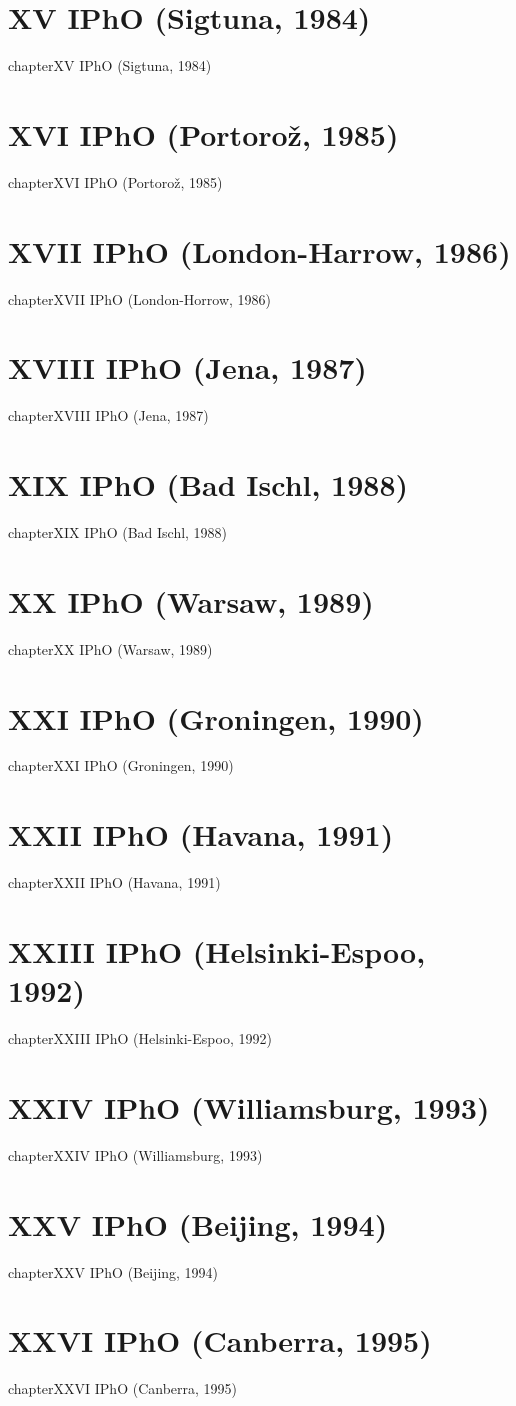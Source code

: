 \documentclass[12pt,a4paper]{book}
\begin{document}
\chapter*{XV IPhO (Sigtuna, 1984)}
{chapter}{XV IPhO (Sigtuna, 1984)}
\chapter*{XVI IPhO (Portoro\v{z}, 1985)}
{chapter}{XVI IPhO (Portoro\v{z}, 1985)}
\chapter*{XVII IPhO (London-Harrow, 1986)}
{chapter}{XVII IPhO (London-Horrow, 1986)}
\chapter*{XVIII IPhO (Jena, 1987)}
{chapter}{XVIII IPhO (Jena, 1987)}
\chapter*{XIX IPhO (Bad Ischl, 1988)}
{chapter}{XIX IPhO (Bad Ischl, 1988)}
\chapter*{XX IPhO (Warsaw, 1989)}
{chapter}{XX IPhO (Warsaw, 1989)}
\chapter*{XXI IPhO (Groningen, 1990)}
{chapter}{XXI IPhO (Groningen, 1990)}
\chapter*{XXII IPhO (Havana, 1991)}
{chapter}{XXII IPhO (Havana, 1991)}
\chapter*{XXIII IPhO (Helsinki-Espoo, 1992)}
{chapter}{XXIII IPhO (Helsinki-Espoo, 1992)}
\chapter*{XXIV IPhO (Williamsburg, 1993)}
{chapter}{XXIV IPhO (Williamsburg, 1993)}
\chapter*{XXV IPhO (Beijing, 1994)}
{chapter}{XXV IPhO (Beijing, 1994)}
\chapter*{XXVI IPhO (Canberra, 1995)}
{chapter}{XXVI IPhO (Canberra, 1995)}
\end{document}
